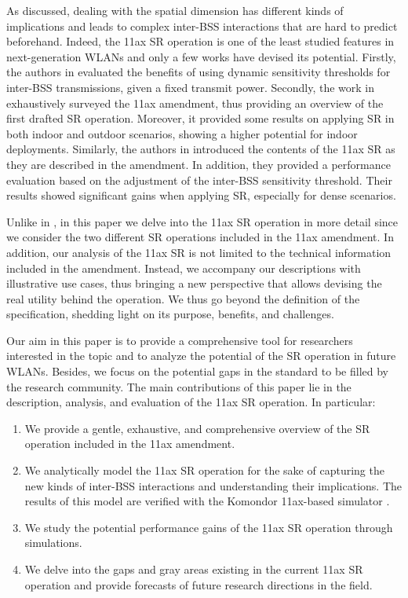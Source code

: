 \documentclass{article}
\begin{document}
As discussed, dealing with the spatial dimension has different kinds of implications and leads to complex inter-BSS interactions that are hard to predict beforehand. Indeed, the 11ax SR operation is one of the least studied features in next-generation WLANs and only a few works have devised its potential. Firstly, the authors in \cite{mori2014performance} evaluated the benefits of using dynamic sensitivity thresholds for inter-BSS transmissions, given a fixed transmit power. Secondly, the work in \cite{qu2018survey} exhaustively surveyed the 11ax amendment, thus providing an overview of the first drafted SR operation. Moreover, it provided some results on applying SR in both indoor and outdoor scenarios, showing a higher potential for indoor deployments. Similarly, the authors in \cite{shen2018research} introduced the contents of the 11ax SR as they are described in the amendment. In addition, they provided a performance evaluation based on the adjustment of the inter-BSS sensitivity threshold. Their results showed significant gains when applying SR, especially for dense scenarios. 

Unlike in \cite{mori2014performance, qu2018survey, shen2018research}, in this paper we delve into the 11ax SR operation in more detail since we consider the two different SR operations included in the 11ax amendment. In addition, our analysis of the 11ax SR is not limited to the technical information included in the amendment. Instead, we accompany our descriptions with illustrative use cases, thus bringing a new perspective that allows devising the real utility behind the operation. We thus go beyond the definition of the specification, shedding light on its purpose, benefits, and challenges.

Our aim in this paper is to provide a comprehensive tool for researchers interested in the topic and to analyze the potential of the SR operation in future WLANs. Besides, we focus on the potential gaps in the standard to be filled by the research community. The main contributions of this paper lie in the description, analysis, and evaluation of the 11ax SR operation. In particular:
\begin{enumerate}
	\item We provide a gentle, exhaustive, and comprehensive overview of the SR operation included in the 11ax amendment.
	\item We analytically model the 11ax SR operation for the sake of capturing the new kinds of inter-BSS interactions and understanding their implications. The results of this model are verified with the Komondor 11ax-based simulator \cite{barrachina2019komondor}.
	\item We study the potential performance gains of the 11ax SR operation through simulations. 
	\item We delve into the gaps and gray areas existing in the current 11ax SR operation and provide forecasts of future research directions in the field.
\end{enumerate}
\end{document}
